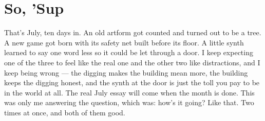 \documentclass[11pt,letterpaper]{article}
\begin{document}
\section{So, 'Sup}

That's July, ten days in. An old artform got counted and turned out to be a tree. A new game got born with its safety net built before its floor. A little synth learned to say one word less so it could be let through a door. I keep expecting one of the three to feel like the real one and the other two like distractions, and I keep being wrong --- the digging makes the building mean more, the building keeps the digging honest, and the synth at the door is just the toll you pay to be in the world at all. The real July essay will come when the month is done. This was only me answering the question, which was: how's it going? Like that. Two times at once, and both of them good.

\end{document}
